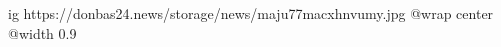 
 
 
 
 

\ifcmt
  ig https://donbas24.news/storage/news/maju77macxhnvumy.jpg
  @wrap center
  @width 0.9
\fi
